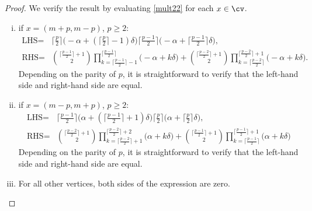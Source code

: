 \documentclass[10pt, a4paper, reqno]{amsart}
\begin{document}
	
	\begin{proof}
		We verify the result by evaluating \eqref{mult22} for each $x\in\cv$.
\begin{enumerate}[(i)]
	\item if $x=(m+p,m-p)$, $p\geq 2$: 
	\[\begin{split}
\text{LHS}=&\lceil \frac{p}{2}\rceil \Big(-\alpha +(\lceil \frac{p}{2}\rceil -1)\delta\Big)
\lceil \frac{p-1}{2} \rceil \Big(-\alpha +\lceil \frac{p-1}{2} \rceil \delta\Big),\\
\text{RHS}=&\binom{\lceil \frac{p-1}{2} \rceil + 1}{\,2\,}\displaystyle\prod_{k=\lceil \frac{p-1}{2} \rceil -1}^{\lceil \frac{p-1}{2} \rceil }\big(-\alpha +k\delta\big)      +	\binom{\lceil \frac{p-2}{2} \rceil + 1}{\,2\,}\displaystyle\prod_{k=\lceil \frac{p-2}{2} \rceil}^{\lceil \frac{p-2}{2} \rceil +1 }\big(-\alpha +k\delta\big).	\end{split}\]
Depending on the parity of $p$, it is straightforward to verify that the left-hand side and right-hand side are equal.


	\item if $x=(m-p,m+p)$, $p\geq 2$: 
	\[\begin{split}
		\text{LHS}=&	\lceil \frac{p-1}{2}\rceil\Big(\alpha+(\lceil \frac{p-1}{2}\rceil+1)\delta \Big) 	{\lceil \frac{p}{2} \rceil}\Big(\alpha+\lceil \frac{p}{2} \rceil\delta \Big) ,\\
		\text{RHS}=&\binom{\lceil \frac{p-2}{2} \rceil+ 1}{\,2\,}\displaystyle\prod_{k=\lceil \frac{p-2}{2} \rceil+1}^{\lceil \frac{p-2}{2} \rceil+2}\Big(\alpha+k\delta \Big)+\binom{\lceil \frac{p-1}{2} \rceil+ 1}{\,2\,}\displaystyle\prod_{k=\lceil \frac{p-1}{2} \rceil}^{\lceil \frac{p-1}{2} \rceil+1 }\Big(\alpha+k\delta \Big) 
	\end{split}\]
	Depending on the parity of $p$, it is straightforward to verify that the left-hand side and right-hand side are equal.
	
\item For all other vertices, both sides of the expression are zero.
	\end{enumerate}	
\end{proof}
	
\end{document}
